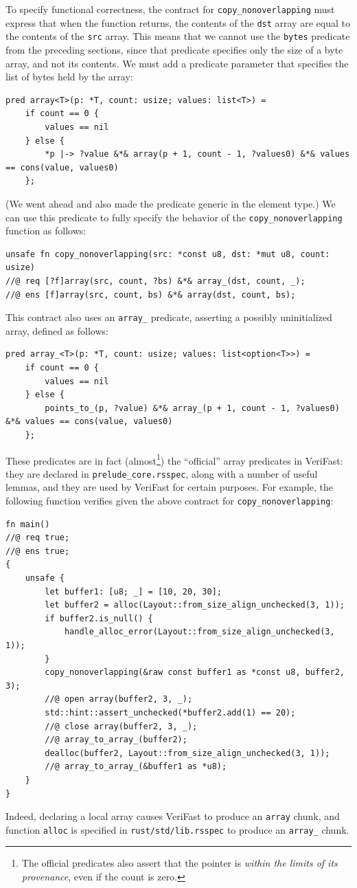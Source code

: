 \documentclass{article}
\begin{document}
To specify functional correctness, the contract for
\lstinline|copy_nonoverlapping| must express that when the function returns,
the contents of the \lstinline|dst| array are equal to the
contents of the \lstinline|src| array. This means that we
cannot use the \lstinline|bytes| predicate from the
preceding sections, since that predicate specifies only the
size of a byte array, and not its contents. We must add a
predicate parameter that specifies the list of bytes held
by the array:
\begin{lstlisting}
pred array<T>(p: *T, count: usize; values: list<T>) =
    if count == 0 {
        values == nil
    } else {
        *p |-> ?value &*& array(p + 1, count - 1, ?values0) &*& values == cons(value, values0)
    };
\end{lstlisting}
(We went ahead and also made the predicate generic in the element type.)
We can use this predicate to fully specify the behavior of the
\lstinline|copy_nonoverlapping| function as follows:
\begin{lstlisting}
unsafe fn copy_nonoverlapping(src: *const u8, dst: *mut u8, count: usize)
//@ req [?f]array(src, count, ?bs) &*& array_(dst, count, _);
//@ ens [f]array(src, count, bs) &*& array(dst, count, bs);
\end{lstlisting}
This contract also uses an \lstinline|array_| predicate, asserting a possibly uninitialized array,
defined as follows:
\begin{lstlisting}
pred array_<T>(p: *T, count: usize; values: list<option<T>>) =
    if count == 0 {
        values == nil
    } else {
        points_to_(p, ?value) &*& array_(p + 1, count - 1, ?values0) &*& values == cons(value, values0)
    };
\end{lstlisting}
These predicates are in fact (almost\footnote{The official predicates also assert that the pointer is \emph{within the limits of its provenance}, even if the count is zero.}) the ``official'' array
predicates in VeriFast: they are declared in \lstinline|prelude_core.rsspec|,
along with a number of useful lemmas, and they are used by
VeriFast for certain purposes. For example, the following
function verifies given the above contract for
\lstinline|copy_nonoverlapping|:
\begin{lstlisting}
fn main()
//@ req true;
//@ ens true;
{
    unsafe {
        let buffer1: [u8; _] = [10, 20, 30];
        let buffer2 = alloc(Layout::from_size_align_unchecked(3, 1));
        if buffer2.is_null() {
            handle_alloc_error(Layout::from_size_align_unchecked(3, 1));
        }
        copy_nonoverlapping(&raw const buffer1 as *const u8, buffer2, 3);
        //@ open array(buffer2, 3, _);
        std::hint::assert_unchecked(*buffer2.add(1) == 20);
        //@ close array(buffer2, 3, _);
        //@ array_to_array_(buffer2);
        dealloc(buffer2, Layout::from_size_align_unchecked(3, 1));
        //@ array_to_array_(&buffer1 as *u8);
    }
}
\end{lstlisting}
Indeed, declaring a local array causes VeriFast to
produce an \lstinline|array| chunk, and function \lstinline|alloc|
is specified in \lstinline|rust/std/lib.rsspec| to produce an \lstinline|array_| chunk.
\end{document}
